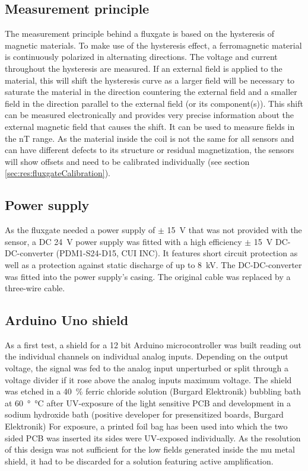         \subsection{Measurement principle}
        \label{sec:matMeth:fluxgateMeasurementPrinciple}
        The measurement principle behind a fluxgate is based on the hysteresis of magnetic materials. To make use of the hysteresis effect, a ferromagnetic material is continuously polarized in alternating directions. The voltage and current throughout the hysteresis are measured. If an external field is applied to the material, this will shift the hysteresis curve as a larger field will be necessary to saturate the material in the direction countering the external field and a smaller field in the direction parallel to the external field (or its component(s)). This shift can be measured electronically and provides very precise information about the external magnetic field that causes the shift.  It can be used to measure fields in the \si{\nano\tesla} range. As the material inside the coil is not the same for all sensors and can have different defects to its structure or residual magnetization, the sensors will show offsets and need to be calibrated individually (see section \ref{sec:res:fluxgateCalibration}).
        \subsection{Power supply}
        As the fluxgate needed a power supply of $\pm$ \SI{15}{\volt} that was not provided with the sensor, a DC \SI{24}{\volt} power supply was fitted with a high efficiency $\pm$ \SI{15}{\volt} DC-DC-converter (PDM1-S24-D15, CUI INC). It features short circuit protection as well as a protection against static discharge of up to \SI{8}{\kilo\volt}. The DC-DC-converter was fitted into the power supply's casing. The original cable was replaced by a three-wire cable.
        \subsection{Arduino Uno shield}
        As a first test, a shield for a 12 bit Arduino microcontroller was built reading out the individual channels on individual analog inputs.  Depending on the output voltage, the signal was fed to the analog input unperturbed or split through a voltage divider if it rose above the analog inputs maximum voltage.  The shield was etched in a \SI{40}{\percent} ferric chloride solution (Burgard Elektronik) bubbling bath at \SI{60}{\degree\celsius} after UV-exposure of the light sensitive PCB and development in a sodium hydroxide bath (positive developer for presensitized boards, Burgard Elektronik)  For exposure, a printed foil bag has been used into which the two sided PCB was inserted  its sides were UV-exposed individually.  As the resolution of this design was not sufficient for the low fields generated inside the mu metal shield, it had to be discarded for a solution featuring active amplification.
